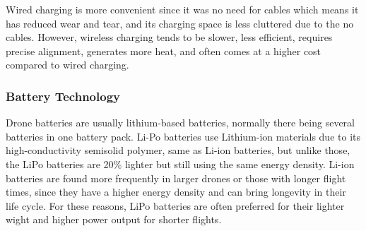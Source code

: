 \documentclass{article}
\begin{document}
Wired charging is more convenient since it was no need for cables which means it has reduced wear and tear, and its charging space is less cluttered due to the no cables. However, wireless charging tends to be slower, less efficient, requires precise alignment, generates more heat, and often comes at a higher cost compared to wired charging.
\cite{wirelessLu}

\subsubsection{Battery Technology}
Drone batteries are usually lithium-based batteries, normally there being several batteries in one battery pack. Li-Po batteries use Lithium-ion materials due to its high-conductivity semisolid polymer, same as Li-ion batteries, but unlike those, the LiPo batteries are 20\% lighter but still using the same energy density. Li-ion batteries are found more frequently in larger drones or those with longer flight times, since they have a higher energy density and can bring longevity in their life cycle. For these reasons, LiPo batteries are often preferred for their lighter wight and higher power output for shorter flights. 
\cite{dronebatteriesKim}

\printbibliography
\end{document}
